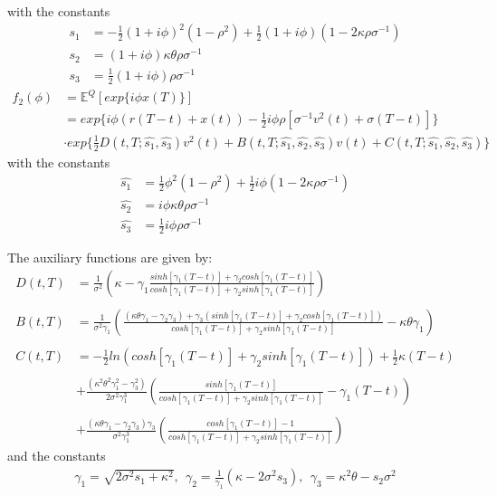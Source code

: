 \documentclass[a4paper,11pt]{article}
\begin{document}
with the constants 
\begin{align*}
s_1 &= -\frac{1}{2}(1+i\phi)^2 (1-\rho^2)+ \frac{1}{2}(1+i\phi)(1-2\kappa\rho\sigma^{-1}) \\
s_2 &= (1+ i\phi)\kappa\theta\rho\sigma^{-1
} \\
s_3 &= \frac{1}{2}(1+i\phi)\rho\sigma^{-1}
\end{align*}
\begin{equation}
\begin{split}
f_2(\phi)&=\mathbb{E}^Q[exp\{i \phi x(T)\}] \\
&= exp\{i\phi(r(T-t)+x(t)) -\frac{1}{2}i\phi\rho[\sigma^{-1}v^2(t)+\sigma(T-t)]\} \\
&\cdot exp\{\frac{1}{2}D(t,T;\hat{s_1},\hat{s_3})v^2(t) +B(t,T;\hat{s_1},
\hat{s_2},\hat{s_3})v(t)+C(t,T;\hat{s_1},\hat{s_2},\hat{s_3})\}
\end{split}
\label{cf22}
\end{equation} 
with the constants 
\begin{align*}
\hat{s_1} &= \frac{1}{2} \phi^2 (1-\rho^2)+ \frac{1}{2} i \phi(1-2\kappa\rho\sigma^{-1}) \\
\hat{s_2} &= i\phi\kappa\theta\rho\sigma^{-1
} \\
\hat{s_3} &= \frac{1}{2} i\phi\rho\sigma^{-1}
\end{align*}

The auxiliary functions are given by:
\begin{equation}
\begin{split}
D(t,T)&=\frac{1}{\sigma^2}\left(\kappa - \gamma_1 \frac{sinh[\gamma_1(T-t)]+\gamma_2 cosh[\gamma_1(T-t)]}{cosh[\gamma_1(T-t)]+\gamma_2 sinh[\gamma_1(T-t)]}\right) \\ \\
B(t,T) &= \frac{1}{\sigma^2\gamma_1} \left(\frac{(\kappa\theta\gamma_1-\gamma_2 \gamma_3)+ \gamma_3(sinh[\gamma_1(T-t)] + \gamma_2 cosh[\gamma_1(T-t)])}{cosh[\gamma_1(T-t)] + \gamma_2 sinh[\gamma_1(T-t)]}-\kappa\theta\gamma_1 \right) \\ \\
C(t,T)&= -\frac{1}{2} ln(cosh[\gamma_1(T-t)] +\gamma_2 sinh[\gamma_1(T-t)])+\frac{1}{2}\kappa(T-t) \\ \\
&+ \frac{(\kappa^2\theta^2\gamma_1^{2} - \gamma_3^{2})}{2\sigma^2\gamma_1^{3}}\left(\frac{sinh[\gamma_1(T-t)]}{cosh[\gamma_1(T-t)]+\gamma_2sinh[\gamma_1(T-t)]}-\gamma_1(T-t)\right) \\ \\
&+ \frac{(\kappa\theta\gamma_1-\gamma_2\gamma_3)\gamma_3}{\sigma^2\gamma_1^{3}}\left(\frac{cosh[\gamma_1(T-t)]-1}{cosh[\gamma_1(T-t)]+\gamma_2 sinh[\gamma_1(T-t)]}\right)
\end{split}
\label{AXF}
\end{equation}
and the constants
\begin{align*}
\gamma_1=\sqrt{2\sigma^2s_1+\kappa^2}, \  \  \gamma_2=\frac{1}{\gamma_1}(\kappa-2\sigma^2s_3), \ \ \gamma_3=\kappa^2\theta-s_2\sigma^2
\end{align*}
\end{document}
